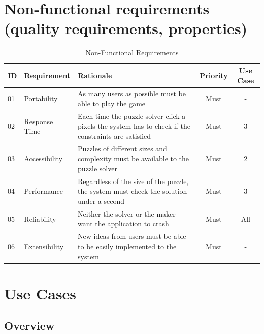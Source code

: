 \documentclass[12pt]{article}
\begin{document}
\clearpage

\section{Non-functional requirements (quality requirements, properties)}

\begin{table}[htbp]
\caption{Non-Functional Requirements}
\begin{center}
\begin{tabularx}{\textwidth}{|p{0.75cm} | X| X| c| c|}
\hline
\textbf{ID} & \textbf{Requirement} & \textbf{Rationale} & \textbf{Priority} & \textbf{Use Case}\\
\hline\hline
01  & Portability & As many users as possible must be able to play the game & Must & -\\
\hline
02  & Response Time & Each time the puzzle solver click a pixels the system has to check if the constraints are satisfied & Must & 3 \\
\hline
03  & Accessibility & Puzzles of different sizes and complexity must be available to the puzzle solver  & Must & 2 \\
\hline
04  & Performance & Regardless of the size of the puzzle, the system must check the solution under a second & Must & 3 \\
\hline
05  & Reliability & Neither the solver or the maker want the application to crash  & Must & All \\
\hline
06  & Extensibility & New ideas from users must be able to be easily implemented to the system & Must & - \\
\hline
\end{tabularx}
\end{center}
\end{table}

\clearpage

\section{Use Cases}

\subsection{Overview}
\end{document}
